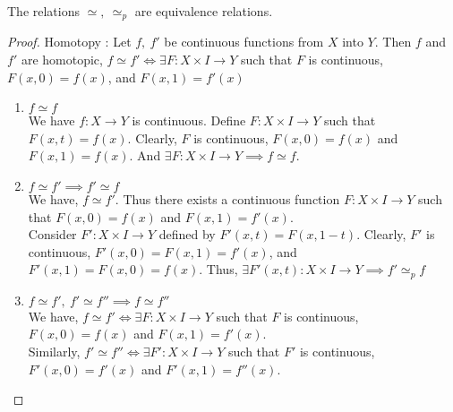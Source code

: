 \begin{proposition}
	The relations $\simeq,\ \simeq_p$ are equivalence relations.
\end{proposition}
\begin{proof}
	Homotopy : Let $f,\ f'$ be continuous functions from $X$ into $Y$. Then $f$ and $f'$ are homotopic, $f \simeq f' \iff \exists F : X \times I \to Y$ such that $F$ is continuous, $F(x,0)=f(x)$, and $F(x,1)=f'(x)$
	\begin{enumerate}
		\item $f \simeq f$ \\
			We have $f : X \to Y$ is continuous. Define $F : X \times I \to Y$ such that $F(x,t)=f(x)$. Clearly, $F$ is continuous, $F(x,0) = f(x)$ and $F(x,1) = f(x)$. And $\exists F : X \times I \to Y \implies f \simeq f$.
		\item $f \simeq f' \implies f' \simeq f$\\ We have, $f \simeq f'$. Thus there exists a continuous function $F : X \times I \to Y$ such that $F(x,0) = f(x)$ and $F(x,1) = f'(x)$.\\ Consider $F' : X \times I \to Y$ defined by $F'(x,t) = F(x,1-t)$. Clearly, $F'$ is continuous, $F'(x,0) = F(x,1) = f'(x)$, and $F'(x,1) = F(x,0) = f(x)$. Thus, $\exists F'(x,t) : X \times I \to Y \implies f' \simeq_p f$
		\item $f \simeq f',\ f' \simeq f'' \implies f \simeq f''$\\
			We have, $f \simeq f' \iff \exists F : X \times I \to Y$ such that $F$ is continuous, $F(x,0) = f(x)$ and $F(x,1) = f'(x)$.\\
			
			Similarly, $f' \simeq f'' \iff \exists F' : X \times I \to Y$ such that $F'$ is continuous, $F'(x,0) = f'(x)$ and $F'(x,1) = f''(x)$.\\


\end{enumerate}
\end{proof}
